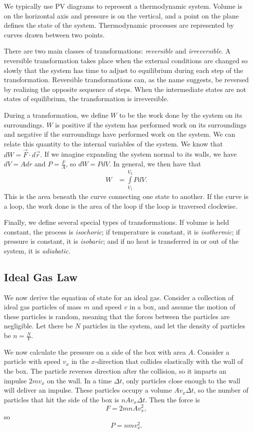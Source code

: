 We typically use PV diagrams to represent a thermodynamic system. Volume is on the horizontal axis and pressure is on the vertical, and a point on the plane defines the state of the system. Thermodynamic processes are represented by curves drawn between two points.

There are two main classes of transformations: \textit{reversible} and \textit{irreversible}. A reversible transformation takes place when the external conditions are changed so slowly that the system has time to adjust to equilibrium during each step of the transformation. Reversible transformations can, as the name suggests, be reversed by realizing the opposite sequence of steps. When the intermediate states are not states of equilibrium, the transformation is irreversible. 

During a transformation, we define $W$ to be the work done by the system on its surroundings. $W$ is positive if the system has performed work on its surroundings and negative if the surroundings have performed work on the system. We can relate this quantity to the internal variables of the system. We know that $dW = \vec{F}\cdot d\vec{r}.$ If we imagine expanding the system normal to its walls, we have $dV = A dr$ and $P = \tfrac{F}{A}$, so $dW = P dV$. In general, we then have that \begin{align}W &= \int\limits_{V_1}^{V_2} P dV.\label{eq:W} \end{align} This is the area beneath the curve connecting one state to another. If the curve is a loop, the work done is the area of the loop if the loop is traversed clockwise.

Finally, we define several special types of transformations. If volume is held constant, the process is \textit{isochoric}; if temperature is constant, it is \textit{isothermic}; if pressure is constant, it is \textit{isobaric}; and if no heat is transferred in or out of the system, it is \textit{adiabatic}.
\subsection{Ideal Gas Law}
We now derive the equation of state for an ideal gas. Consider a collection of ideal gas particles of mass $m$ and speed $v$ in a box, and assume the motion of these particles is random, meaning that the forces between the particles are negligible. Let there be $N$ particles in the system, and let the density of particles be $n = \tfrac{N}{V}$.

We now calculate the pressure on a side of the box with area $A$. Consider a particle with speed $v_x$ in the $x$-direction that collides elastically with the wall of the box. The particle reverses direction after the collision, so it imparts an impulse $2mv_x$ on the wall. In a time $\Delta t$, only particles close enough to the wall will deliver an impulse. These particles occupy a volume $A v_x \Delta t$, so the number of particles that hit the side of the box is $nAv_x \Delta t$. Then the force is $$F = 2mnAv_x^2,$$ so $$P = nmv_x^2.$$ 

